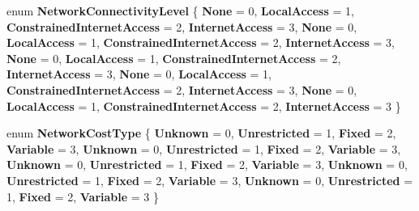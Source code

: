 \begin{DoxyCompactItemize}
\item 
\mbox{\label{namespace_windows_1_1_networking_1_1_connectivity_a2c33b149aa0f99f8a20a09851e23f36a}} 
enum {\bfseries Network\+Connectivity\+Level} \{ \newline
{\bfseries None} = 0, 
{\bfseries Local\+Access} = 1, 
{\bfseries Constrained\+Internet\+Access} = 2, 
{\bfseries Internet\+Access} = 3, 
\newline
{\bfseries None} = 0, 
{\bfseries Local\+Access} = 1, 
{\bfseries Constrained\+Internet\+Access} = 2, 
{\bfseries Internet\+Access} = 3, 
\newline
{\bfseries None} = 0, 
{\bfseries Local\+Access} = 1, 
{\bfseries Constrained\+Internet\+Access} = 2, 
{\bfseries Internet\+Access} = 3, 
\newline
{\bfseries None} = 0, 
{\bfseries Local\+Access} = 1, 
{\bfseries Constrained\+Internet\+Access} = 2, 
{\bfseries Internet\+Access} = 3, 
\newline
{\bfseries None} = 0, 
{\bfseries Local\+Access} = 1, 
{\bfseries Constrained\+Internet\+Access} = 2, 
{\bfseries Internet\+Access} = 3
 \}
\item 
\mbox{\label{namespace_windows_1_1_networking_1_1_connectivity_a1588bce4ba10673fae3a14c52de8ceb8}} 
enum {\bfseries Network\+Cost\+Type} \{ \newline
{\bfseries Unknown} = 0, 
{\bfseries Unrestricted} = 1, 
{\bfseries Fixed} = 2, 
{\bfseries Variable} = 3, 
\newline
{\bfseries Unknown} = 0, 
{\bfseries Unrestricted} = 1, 
{\bfseries Fixed} = 2, 
{\bfseries Variable} = 3, 
\newline
{\bfseries Unknown} = 0, 
{\bfseries Unrestricted} = 1, 
{\bfseries Fixed} = 2, 
{\bfseries Variable} = 3, 
\newline
{\bfseries Unknown} = 0, 
{\bfseries Unrestricted} = 1, 
{\bfseries Fixed} = 2, 
{\bfseries Variable} = 3, 
\newline
{\bfseries Unknown} = 0, 
{\bfseries Unrestricted} = 1, 
{\bfseries Fixed} = 2, 
{\bfseries Variable} = 3
 \}
\item 
\mbox{\label{namespace_windows_1_1_networking_1_1_connectivity_a2c33b149aa0f99f8a20a09851e23f36a}} 

\end{DoxyCompactItemize}
